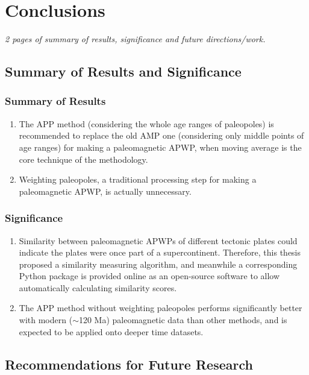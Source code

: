 \chapter{Conclusions}\label{chap:Concl}
\textit{2 pages of summary of results, significance and future
directions/work.}
\vfill
\minitoc\newpage

\section{Summary of Results and Significance}

\subsection{Summary of Results}

\begin{enumerate}
  \item The APP method (considering the whole age ranges of paleopoles) is
  recommended to replace the old AMP one (considering only middle points of age
  ranges) for making a paleomagnetic APWP, when moving average is the core
  technique of the methodology.
  \item Weighting paleopoles, a traditional processing step for making a
  paleomagnetic APWP, is actually unnecessary.
\end{enumerate}

\subsection{Significance}

\begin{enumerate}
  \item Similarity between paleomagnetic APWPs of different tectonic plates
  could indicate the plates were once part of a supercontinent. Therefore, this
  thesis proposed a similarity measuring algorithm, and meanwhile a
  corresponding Python package is provided online as an open-source software to
  allow automatically calculating similarity scores.
  \item The APP method without weighting paleopoles performs significantly
  better with modern ($\sim$120 Ma) paleomagnetic data than other
  methods, and is expected to be applied onto deeper time datasets.
\end{enumerate}

\section{Recommendations for Future Research}

